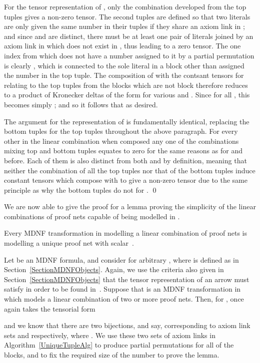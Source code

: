 \documentclass{LMCS}
\theoremstyle{plain}\newtheorem*{cLm}{Claim}
\newcommand{\p}{} \newcommand{\N}{\mathbb{N}}
\begin{document}
  \p For the tensor representation of , only the combination developed from the top tuples gives a non-zero tensor. The second tuples are defined so that two literals are only given the same number in their tuples if they share an axiom link in ; and since  and  are distinct, there must be at least one pair of literals joined by an axiom link in  which does not exist in , thus leading to a zero tensor. The one index from  which does not have a number assigned to it by a partial permutation is clearly , which is connected to the sole literal in a block other than  assigned the number  in the top tuple. The composition of  with the contsant tensors for relating to the top tuples from the  blocks which are not block  therefore reduces to a product of Kronecker deltas of the form  for various  and . Since  for all , this becomes simply ; and so it follows that  as desired.
  
  \p The argument for the representation of  is fundamentally identical, replacing the bottom tuples for the top tuples throughout the above paragraph. For every other  in the linear combination when composed any one of the  combinations mixing top and bottom tuples equates to zero for the same reasons as for  and  before. Each of them is also distinct from both  and  by definition, meaning that neither the combination of all the top tuples nor that of the bottom tuples induce constant tensors which compose with  to give a non-zero tensor due to the same principle as why the bottom tuples do not for . \qed
  
  We are now able to give the proof for a lemma proving the simplicity of the linear combinations of proof nets capable of being modelled in .
  
  \begin{prop} \label{UniqueLemma} Every MDNF transformation in 
    modelling a linear combination of proof nets is modelling a unique
    proof net with scalar~.
  \end{prop}
  \proof
    Let  be an MDNF formula, and consider
     for arbitrary , where
     is defined as in Section~\ref{SectionMDNFObjects}. Again,
    we use the criteria also given in Section~\ref{SectionMDNFObjects} that the
    tensor representation of an arrow  must satisfy in
    order to be found in~. Suppose that  is an MDNF
    transformation in  which models a linear combination of two or
    more proof nets. Then, for ,
     once again takes the tensorial form
    
    and we know that there are two bijections,  and
     say, corresponding to axiom link sets  and
     respectively, where . We use these two sets of axiom links in
    Algorithm~\ref{UniqueTupleAlg} to produce partial permutations
     for all of the blocks, and to fix the
    required size of the number  to prove the lemma.
  
\end{document}
